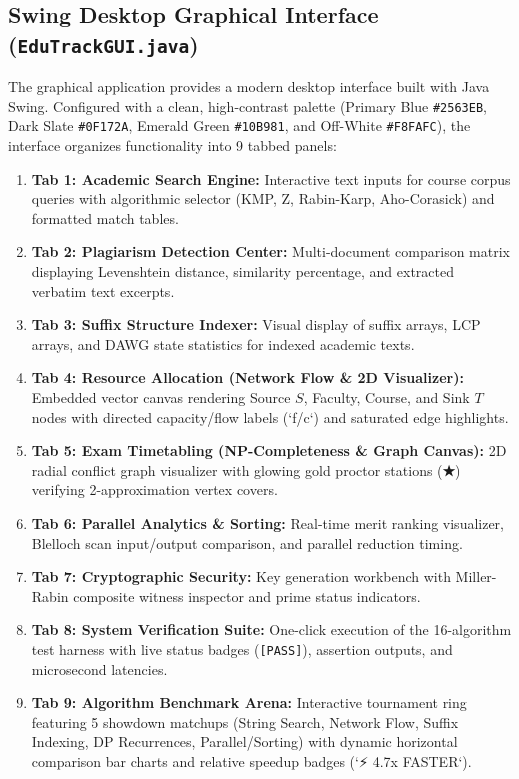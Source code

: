 \subsection{Swing Desktop Graphical Interface (\texttt{EduTrackGUI.java})}
The graphical application provides a modern desktop interface built with Java Swing. Configured with a clean, high-contrast palette (Primary Blue \texttt{\#2563EB}, Dark Slate \texttt{\#0F172A}, Emerald Green \texttt{\#10B981}, and Off-White \texttt{\#F8FAFC}), the interface organizes functionality into 9 tabbed panels:
\begin{enumerate}
    \item \textbf{Tab 1: Academic Search Engine:} Interactive text inputs for course corpus queries with algorithmic selector (KMP, Z, Rabin-Karp, Aho-Corasick) and formatted match tables.
    \item \textbf{Tab 2: Plagiarism Detection Center:} Multi-document comparison matrix displaying Levenshtein distance, similarity percentage, and extracted verbatim text excerpts.
    \item \textbf{Tab 3: Suffix Structure Indexer:} Visual display of suffix arrays, LCP arrays, and DAWG state statistics for indexed academic texts.
    \item \textbf{Tab 4: Resource Allocation (Network Flow \& 2D Visualizer):} Embedded vector canvas rendering Source $S$, Faculty, Course, and Sink $T$ nodes with directed capacity/flow labels (`f/c`) and saturated edge highlights.
    \item \textbf{Tab 5: Exam Timetabling (NP-Completeness \& Graph Canvas):} 2D radial conflict graph visualizer with glowing gold proctor stations (\textbf{★}) verifying 2-approximation vertex covers.
    \item \textbf{Tab 6: Parallel Analytics \& Sorting:} Real-time merit ranking visualizer, Blelloch scan input/output comparison, and parallel reduction timing.
    \item \textbf{Tab 7: Cryptographic Security:} Key generation workbench with Miller-Rabin composite witness inspector and prime status indicators.
    \item \textbf{Tab 8: System Verification Suite:} One-click execution of the 16-algorithm test harness with live status badges (\texttt{[PASS]}), assertion outputs, and microsecond latencies.
    \item \textbf{Tab 9: Algorithm Benchmark Arena:} Interactive tournament ring featuring 5 showdown matchups (String Search, Network Flow, Suffix Indexing, DP Recurrences, Parallel/Sorting) with dynamic horizontal comparison bar charts and relative speedup badges (`⚡ 4.7x FASTER`).
\end{enumerate}

